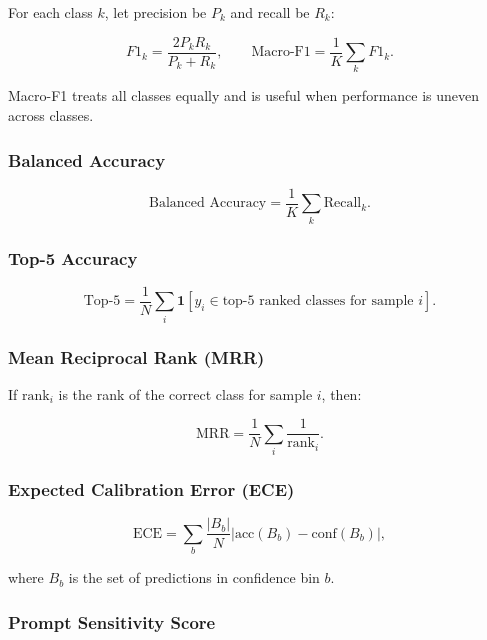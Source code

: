 \documentclass[11pt]{article}
\begin{document}
For each class $k$, let precision be $P_k$ and recall be $R_k$:

\begin{equation}
F1_k = \frac{2 P_k R_k}{P_k + R_k},
\qquad
\text{Macro-F1} = \frac{1}{K} \sum_k F1_k.
\end{equation}

Macro-F1 treats all classes equally and is useful when performance is uneven
across classes.

\subsubsection*{Balanced Accuracy}

\begin{equation}
\text{Balanced Accuracy} = \frac{1}{K} \sum_k \text{Recall}_k.
\end{equation}

\subsubsection*{Top-5 Accuracy}

\begin{equation}
\text{Top-5} = \frac{1}{N} \sum_i \mathbf{1}[y_i \in \text{top-5 ranked classes for sample } i].
\end{equation}

\subsubsection*{Mean Reciprocal Rank (MRR)}

If $\text{rank}_i$ is the rank of the correct class for sample $i$, then:

\begin{equation}
\text{MRR} = \frac{1}{N} \sum_i \frac{1}{\text{rank}_i}.
\end{equation}

\subsubsection*{Expected Calibration Error (ECE)}

\begin{equation}
\text{ECE} = \sum_b \frac{|B_b|}{N} \left| \text{acc}(B_b) - \text{conf}(B_b) \right|,
\end{equation}

where $B_b$ is the set of predictions in confidence bin $b$.

\subsubsection*{Prompt Sensitivity Score}
\end{document}
